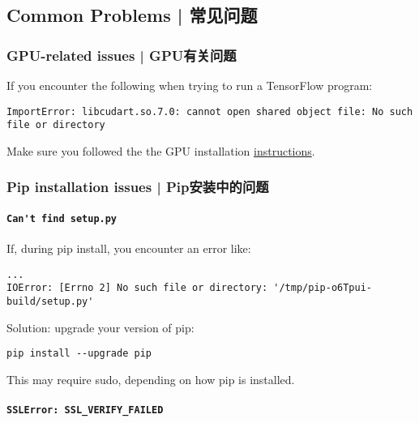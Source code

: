 %

\subsection {Common Problems  |  常见问题} \label{comm_prob}

\subsubsection {GPU-related issues  |  GPU有关问题}

If you encounter the following when trying to run a TensorFlow program:

\begin{lstlisting}
ImportError: libcudart.so.7.0: cannot open shared object file: No such file or directory
\end{lstlisting}

Make sure you followed the the GPU installation \hyperref[install_cuda]{instructions}.

\subsubsection {Pip installation issues  |  Pip安装中的问题}

\paragraph{\lstinline{Can't find setup.py}}

If, during pip install, you encounter an error like:

\begin{lstlisting}
...
IOError: [Errno 2] No such file or directory: '/tmp/pip-o6Tpui-build/setup.py'
\end{lstlisting}

Solution: upgrade your version of pip:

\begin{lstlisting}
pip install --upgrade pip
\end{lstlisting}

This may require sudo, depending on how pip is installed.

\paragraph{\lstinline{SSLError: SSL_VERIFY_FAILED}}

